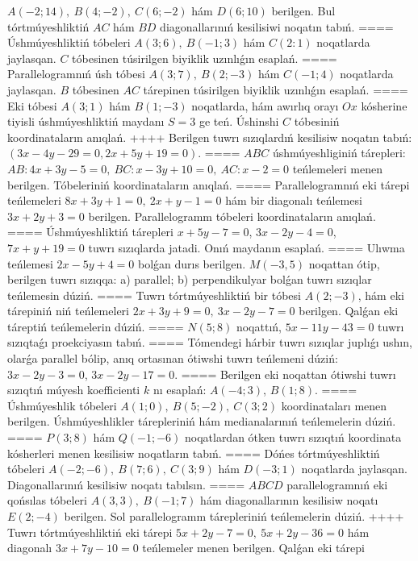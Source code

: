 \(A (-2;14),\ B (4;-2),\ C (6;-2) \) hám \(D (6;10) \) berilgen. Bul
tórtmúyeshliktiń $AC$ hám $BD$ diagonallarınıń kesilisiwi
noqatın tabıń.
====
Úshmúyeshliktiń tóbeleri \(A (3;6),\ B (-1;3) \) hám
\(C (2: 1) \) noqatlarda jaylasqan. $C$ tóbesinen túsirilgen biyiklik uzınlıǵın esaplań.
====
Parallelogramnıń úsh tóbesi \(A (3;7),\ B (2;-3) \) hám
\(C (-1;4) \) noqatlarda jaylasqan. $B$ tóbesinen $AC$
tárepinen túsirilgen biyiklik uzınlıǵın esaplań.
====
Eki tóbesi \(A (3;1) \) hám \(B (1;-3) \) noqatlarda, hám
awırlıq orayı $Ox$ kósherine tiyisli úshmúyeshliktiń maydanı
\(S=3\) ge teń. Úshinshi $C$ tóbesiniń koordinataların anıqlań.
++++
Berilgen tuwrı sızıqlardıń kesilisiw noqatın tabıń:
$(3x-4y-29=0, 2x+5y+19=0) $.
====
$ABC$ úshmúyeshliginiń tárepleri:
\(AB:4x+3y-5=0,\ BC:x-3y+10=0,\ AC:x-2=0\)
teńlemeleri menen berilgen. Tóbeleriniń koordinataların anıqlań.
====
Parallelogramnıń eki tárepi teńlemeleri
\(8x+3y+1=0,\ 2x+y-1=0\) hám bir diagonalı teńlemesi
\(3x+2y+3=0\) berilgen. Parallelogramm tóbeleri koordinataların
anıqlań.
====
Úshmúyeshliktiń tárepleri \(x+5y-7=0\),
\(3x-2y-4=0\), \(7x+y+19=0\) tuwrı sızıqlarda jatadi. Onıń
maydanın esaplań.
====
Ulıwma teńlemesi \(2x-5y+4=0\) bolǵan durıs
berilgen. \(M (-3,5) \) noqattan ótip, berilgen tuwrı sızıqqa: a) parallel;
b) perpendikulyar bolǵan tuwrı sızıqlar teńlemesin dúziń.
====
Tuwrı tórtmúyeshliktiń bir tóbesi \(A (2;-3) \), hám eki tárepiniń
niń teńlemeleri \(2x+3y+9=0,\ 3x-2y-7=0\)
berilgen. Qalǵan eki táreptiń teńlemelerin dúziń.
====
\(N (5;8) \) noqattıń, \(5x-11y-43=0\) tuwrı sızıqtaǵı
proekciyasın tabıń.
====
Tómendegi hárbir tuwrı sızıqlar juplıǵı ushın, olarǵa parallel
bólip, anıq ortasınan ótiwshi tuwrı teńlemeni dúziń: $3x-2y-3=0$, $3x-2y-17=0$.
====
Berilgen eki noqattan ótiwshi tuwrı sızıqtıń múyesh
koefficienti $k$ nı esaplań: $A (-4;3) $, $B (1;8) $.
====
Úshmúyeshlik tóbeleri \(A (1;0),\ B (5;-2),\ C (3;2) \)
koordinataları menen berilgen. Úshmúyeshlikler tárepleriniń hám
medianalarınıń teńlemelerin dúziń.
====
\(P (3;8) \) hám \(Q (-1;-6) \) noqatlardan ótken
tuwrı sızıqtıń koordinata kósherleri menen kesilisiw noqatların tabıń.
====
Dóńes tórtmúyeshliktiń tóbeleri
\(A (-2;-6),\ B (7;6),\ C (3;9) \) hám \(D (-3;1) \) noqatlarda
jaylasqan. Diagonallarınıń kesilisiw noqatı tabılsın.
====
$ABCD$ parallelogramnıń eki qońsılas tóbeleri
\(A (3,3),\ B (-1;7) \) hám diagonallarının kesilisiw noqatı
\(E (2;-4) \) berilgen. Sol parallelogramm tárepleriniń teńlemelerin
dúziń.
++++
Tuwrı tórtmúyeshliktiń eki tárepi
\(5x+2y-7=0,\ 5x+2y-36=0\) hám diagonalı
\(3x+7y-10=0\) teńlemeler menen berilgen. Qalǵan eki tárepi
